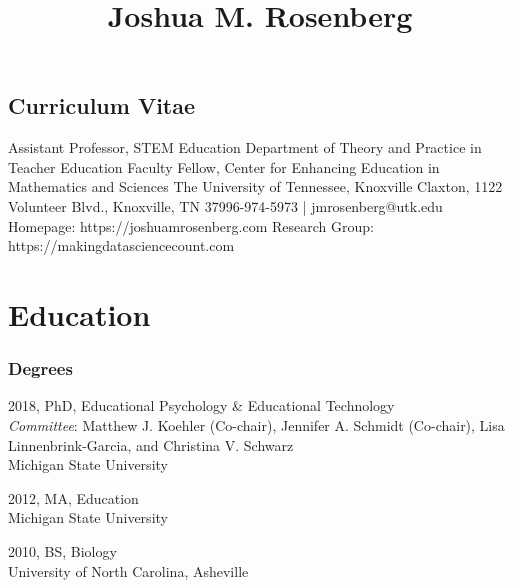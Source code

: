 \documentclass[
  14,
]{article}
\title{Joshua M. Rosenberg\vspace{-3em}}
\author{}
\date{}
\begin{document}
\maketitle
\thispagestyle{empty}

\begin{center}

\section{Curriculum Vitae}\label{curriculum-vitae}

Assistant Professor, STEM Education\linebreak
Department of Theory and Practice in Teacher Education\linebreak
Faculty Fellow, Center for Enhancing Education in Mathematics and Sciences\linebreak
The University of Tennessee, Knoxville Claxton, 1122 Volunteer Blvd., Knoxville, TN 37996-974-5973 | jmrosenberg@utk.edu\linebreak
Homepage: https://joshuamrosenberg.com\linebreak
Research Group: https://makingdatasciencecount.com\linebreak  
\end{center}

\hypertarget{education}{%
\section{Education}\label{education}}

\hypertarget{degrees}{%
\subsubsection{Degrees}\label{degrees}}

2018, PhD, Educational Psychology \& Educational Technology\\
\emph{Committee}: Matthew J. Koehler (Co-chair), Jennifer A. Schmidt
(Co-chair), Lisa Linnenbrink-Garcia, and Christina V. Schwarz\\
Michigan State University

2012, MA, Education\\
Michigan State University

2010, BS, Biology\\
University of North Carolina, Asheville
\end{document}
